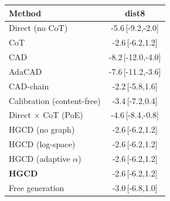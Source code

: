 \begin{tabular}{lc}
\toprule
Method & dist8 \\
\midrule
Direct (no CoT) & -5.6\,{\scriptsize[-9.2,-2.0]} \\
CoT & -2.6\,{\scriptsize[-6.2,1.2]} \\
CAD & -8.2\,{\scriptsize[-12.0,-4.0]} \\
AdaCAD & -7.6\,{\scriptsize[-11.2,-3.6]} \\
CAD-chain & -2.2\,{\scriptsize[-5.8,1.6]} \\
Calibration (content-free) & -3.4\,{\scriptsize[-7.2,0.4]} \\
Direct $\times$ CoT (PoE) & -4.6\,{\scriptsize[-8.4,-0.8]} \\
HGCD (no graph) & -2.6\,{\scriptsize[-6.2,1.2]} \\
HGCD (log-space) & -2.6\,{\scriptsize[-6.2,1.2]} \\
HGCD (adaptive $\alpha$) & -2.6\,{\scriptsize[-6.2,1.2]} \\
\textbf{HGCD} & -2.6\,{\scriptsize[-6.2,1.2]} \\
Free generation & -3.0\,{\scriptsize[-6.8,1.0]} \\
\bottomrule
\end{tabular}
